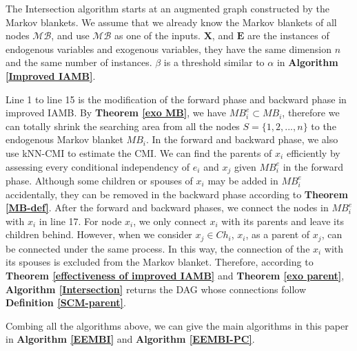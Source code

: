 \documentclass[twoside,11pt]{article}
\begin{document}
The Intersection algorithm starts at an augmented graph constructed by the Markov blankets. We assume that we already know the Markov blankets of all nodes $\mathcal{MB}$, and use $\mathcal{MB}$ as one of the inputs. $\mathbf X$, and $\mathbf E$ are the instances of endogenous variables and exogenous variables, they have the same dimension $n$ and the same number of instances. $\beta$ is a threshold similar to $\alpha$ in \textbf{Algorithm \ref{Improved IAMB}}.

Line 1 to line 15 is the modification of the forward phase and backward phase in improved IAMB. By \textbf{Theorem \ref{exo MB}}, we have $MB^e_i\subset MB_i$, therefore we can totally shrink the searching area from all the nodes $S=\{1, 2, ..., n\}$ to the endogenous Markov blanket $MB_i$. In the forward and backward phase, we also use kNN-CMI to estimate the CMI. We can find the parents of $x_i$ efficiently by assessing every conditional independency of $e_i$ and $x_j$ given $MB^e_i$ in the forward phase. 
Although some children or spouses of $x_i$ may be added in $MB^e_i$ accidentally, they can be removed in the backward phase according to \textbf{Theorem \ref{MB-def}}. After the forward and backward phases, we connect the nodes in $MB^e_i$ with $x_i$ in line 17. For node $x_i$, we only connect $x_i$ with its parents and leave its children behind. However, when we consider $x_j\in Ch_i$, $x_i$, as a parent of $x_j$, can be connected under the same process. In this way, the connection of the $x_i$ with its spouses is excluded from the Markov blanket. Therefore, according to \textbf{Theorem \ref{effectiveness of improved IAMB}} and \textbf{Theorem \ref{exo parent}}, \textbf{Algorithm \ref{Intersection}} returns the DAG whose connections follow \textbf{Definition \ref{SCM-parent}}.

Combing all the algorithms above, we can give the main algorithms in this paper in \textbf{Algorithm \ref{EEMBI}} and \textbf{Algorithm \ref{EEMBI-PC}}.
\end{document}
